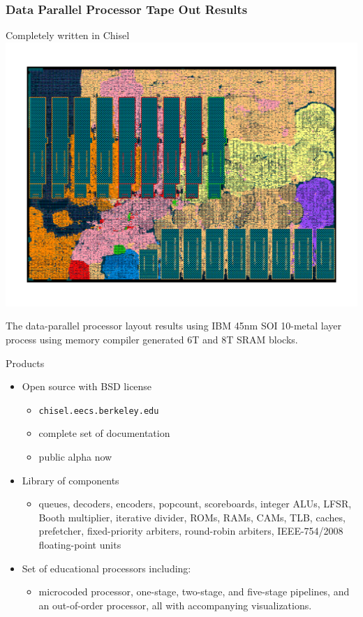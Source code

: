 \documentclass[xcolor=pdflatex,dvipsnames,table]{beamer}
\begin{document}
\begin{frame}[fragile]
\frametitle{Data Parallel Processor Tape Out Results}

\begin{center}
Completely written in Chisel
\includegraphics[height=0.7\textheight]{figs/ibm45.png}

\begin{footnotesize}
The data-parallel processor layout results using IBM 45nm SOI 10-metal layer process using memory compiler generated 6T and 8T SRAM blocks.
\end{footnotesize}
\end{center}

\end{frame}

\begin{frame}[fragile]{Products}

\begin{itemize}
\item Open source with BSD license
\begin{itemize}
\item \verb+chisel.eecs.berkeley.edu+
\item complete set of documentation
\item public alpha now
\end{itemize}
\item Library of components
\begin{itemize}
\item queues, decoders, encoders, popcount, scoreboards, integer ALUs, LFSR, Booth multiplier, iterative divider, ROMs, RAMs, CAMs, TLB, caches, prefetcher, fixed-priority arbiters, round-robin arbiters, IEEE-754/2008 floating-point units
\end{itemize}
\item Set of educational processors including:
\begin{itemize}
\item microcoded processor, one-stage, two-stage, and five-stage pipelines, and an out-of-order processor, all with accompanying visualizations.
\end{itemize}
\end{itemize}

\end{frame}
\end{document}
